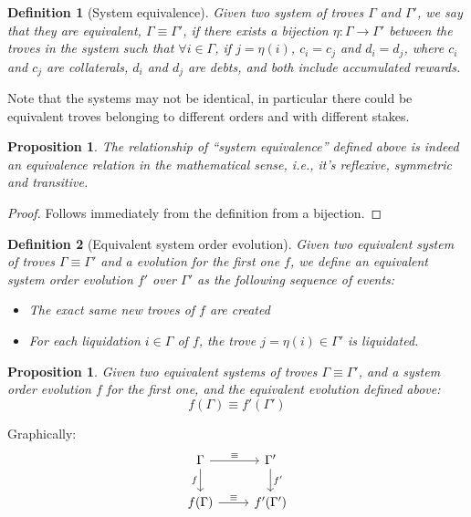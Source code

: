 \documentclass[reqno]{article}
\newtheorem{definition}{Definition}[section]
\newtheorem{proposition}[theorem]{Proposition}
\begin{document}
\begin{definition}[System equivalence]
  Given two system of troves $\Gamma$ and $\Gamma'$, we say that they are equivalent, $\Gamma \equiv \Gamma'$, if there exists a bijection $\eta: \Gamma \rightarrow \Gamma'$ between the troves in the system such that $ \forall i \in \Gamma$, if $j = \eta(i)$, $c_i = c_j$ and $d_i = d_j$, where $c_i$ and $c_j$ are collaterals, $d_i$ and $d_j$ are debts, and both include accumulated rewards.
\end{definition}

Note that the systems may not be identical, in particular there could be equivalent troves belonging to different orders and with different stakes.

\begin{proposition}
  The relationship of “system equivalence” defined above is indeed an equivalence relation in the mathematical sense, i.e., it’s reflexive, symmetric and transitive.
\end{proposition}
\begin{proof}
  Follows immediately from the definition from a bijection.
\end{proof}

\begin{definition}[Equivalent system order evolution]
  Given two equivalent system of troves $\Gamma \equiv \Gamma'$ and a evolution for the first one $f$, we define an equivalent system order evolution $f'$ over $\Gamma'$ as the following sequence of events:
  \begin{itemize}
  \item The exact same new troves of $f$ are created
  \item For each liquidation $i \in \Gamma$ of $f$, the trove $j = \eta(i) \in \Gamma'$ is liquidated.
  \end{itemize}

\end{definition}

\begin{proposition} \label{proposition:equivalent_evolution}
  Given two equivalent systems of troves $\Gamma \equiv \Gamma'$, and a system order evolution $f$ for the first one, and the equivalent evolution defined above:
\begin{equation}
  f(\Gamma) \equiv f'(\Gamma')
\end{equation}
\end{proposition}

Graphically:
\[
  \begin{tikzcd}
    \Gamma \arrow{r}{\equiv} \arrow[swap]{d}{f} & \Gamma' \arrow{d}{f'} \\
    f(\Gamma) \arrow{r}{\equiv} & f'(\Gamma')
  \end{tikzcd}
\]
\end{document}
